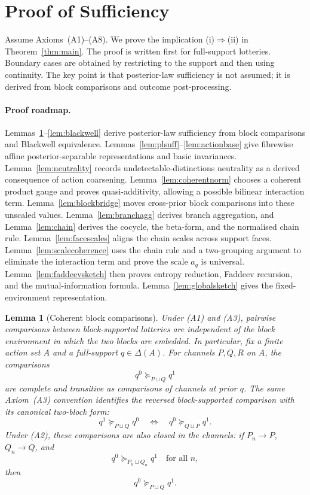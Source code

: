 \documentclass[11pt,a4paper]{article}
\newtheorem{lemma}[theorem]{Lemma}
\theoremstyle{definition}
\newcommand{\1}{\mathbf 1}
\begin{document}
\section*{Proof of Sufficiency}

Assume Axioms~\textup{(A1)--(A8)}.  We prove the implication \textup{(i)$\Rightarrow$(ii)} in
Theorem~\ref{thm:main}.  The proof is written first for full-support lotteries.  Boundary cases are obtained by
restricting to the support and then using continuity.  The key point is that posterior-law sufficiency is not assumed; it
is derived from block comparisons and outcome post-processing.

\paragraph{Proof roadmap.}
Lemmas~\ref{lem:blockcoh}--\ref{lem:blackwell} derive posterior-law sufficiency from block comparisons and Blackwell
equivalence.  Lemmas~\ref{lem:plsuff}--\ref{lem:actionbase} give fibrewise affine posterior-separable representations
and basic invariances.  Lemma~\ref{lem:neutrality} records undetectable-distinctions neutrality as a derived consequence
of action coarsening.  Lemma~\ref{lem:coherentnorm} chooses a coherent product gauge and proves quasi-additivity, allowing
a possible bilinear interaction term.  Lemma~\ref{lem:blockbridge} moves cross-prior block comparisons into these
unscaled values.  Lemma~\ref{lem:branchagg} derives branch aggregation, and Lemma~\ref{lem:chain} derives the cocycle,
the beta-form, and the normalised chain rule.  Lemma~\ref{lem:facescales} aligns the chain scales across support faces.
Lemma~\ref{lem:scalecoherence} uses the chain rule and a two-grouping argument to eliminate the interaction term and prove
the scale $a_q$ is universal.
Lemma~\ref{lem:faddeevsketch} then proves entropy reduction, Faddeev recursion, and the mutual-information formula.
Lemma~\ref{lem:globalsketch} gives the fixed-environment representation.

\begin{lemma}[Coherent block comparisons]\label{lem:blockcoh}
Under \textup{(A1)} and \textup{(A3)}, pairwise comparisons between block-supported lotteries are independent of the block
environment in which the two blocks are embedded.  In particular, fix a finite action set $A$ and a full-support
$q\in\Delta(A)$.  For channels $P,Q,R$ on $A$, the comparisons
\[
q^0\succeq_{P\sqcup Q}q^1
\]
are complete and transitive as comparisons of channels at prior $q$.  The same Axiom~\textup{(A3)} convention identifies
the reversed block-supported comparison with its canonical two-block form:
\[
q^1\succeq_{P\sqcup Q}q^0
\quad\Longleftrightarrow\quad
q^0\succeq_{Q\sqcup P}q^1.
\]
Under \textup{(A2)}, these comparisons are also closed in the channels: if
$P_n\to P$, $Q_n\to Q$, and
\[
q^0\succeq_{P_n\sqcup Q_n}q^1
\quad\text{for all }n,
\]
then
\[
q^0\succeq_{P\sqcup Q}q^1.
\]
\end{lemma}
\end{document}
